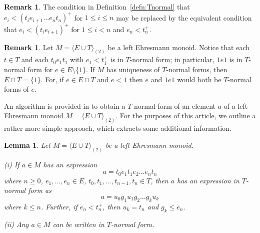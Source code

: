 \documentclass[12pt]{amsart}
\newtheorem{lem}[them]{Lemma}
\theoremstyle{definition}
\newtheorem{rem}[them]{Remark}
\theoremstyle{definition}
\numberwithin{them}{section}
\numberwithin{equation}{section}
\begin{document}
\begin{rem}\label{rem:TTN}
The condition in  Definition~\ref{defn:Tnormal} that $e_i < (t_ie_{i+1}\dots e_nt_n)^{+}$ for $1\leq i\leq n$ may be replaced by the equivalent condition that  $e_i < (t_ie_{i+1})^+ $ for $1\leq i< n$ and $e_n<t_n^+$.
\end{rem}

\begin{rem}\label{rem:TE} Let $M=\langle E \cup T \rangle_{(2)}$  be a left Ehresmann monoid. Notice that each $t\in T$ and each $t_0e_1t_1$ with $e_1<t_1^+$ is in $T$-normal form; in particular, $1e1$ is in $T$-normal form for $e\in E\setminus\{ 1\}$. If $M$ 
has  uniqueness of $T$-normal forms, then $E\cap T=\{ 1\}$. For, if $e\in E\cap T$ and $e<1$ then $e$ and $1e1$ would both be $T$-normal forms of $e$. \end{rem}

 
 An algorithm is provided in \cite[Lemma 3.1]{BGG} to obtain a $T$-normal form of an element $a$ of a left Ehresmann monoid $M=\langle E \cup T \rangle_{(2)}$.  For the purposes of this article, we outline a rather more simple approach, which extracts  some additional information. 


\begin{lem}\cite{BGG}\label{bgg}
 Let $M=\langle E \cup T \rangle_{(2)}$ be a left Ehresmann monoid.  
  
 (i) If $a\in M$ has an expression
 \[a=t_0e_1t_1e_2\dots e_nt_n\]
where $n \geq 0$, $e_1, \dots, e_n \in E$, $t_0, t_1,  \dots, t_{n-1}, t_n \in T$,  then $a$ has an expression in $T$-normal form as
 \[a=u_0g_1u_1g_2\dots g_ku_k\]
 where $k\leq n$. Further, if $e_n<t_n^+$, then $u_k=t_n$ and $g_k\leq e_n$.
 
 
  (ii) Any $a\in M$ can be written in $T$-normal form.  
\end{lem}
\end{document}
